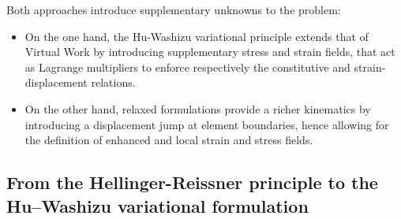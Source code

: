 Both approaches introduce supplementary unknowns to the problem:
\begin{itemize}
  \item On the one hand, the Hu-Washizu variational principle
  extends that of Virtual Work by introducing supplementary stress and
  strain fields, that act as Lagrange multipliers to enforce
  respectively the constitutive and strain-displacement relations.
  \item On the other hand, relaxed formulations provide a richer
  kinematics by introducing a displacement jump at element boundaries,
  hence allowing for the definition of enhanced and local strain and
  stress fields.
\end{itemize}



\subsection{From the Hellinger-Reissner principle to the Hu–Washizu variational formulation}


